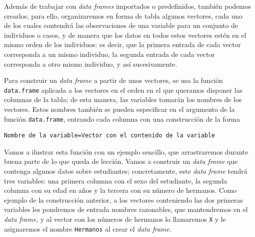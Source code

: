 \documentclass[
]{book}
\theoremstyle{definition}
\theoremstyle{definition}
\theoremstyle{definition}
\theoremstyle{remark}
\begin{document}
Además de trabajar con \emph{data frames} importados o predefinidos, también podemos crearlos; para ello, organizaremos en forma de tabla algunos vectores, cada uno de los cuales contendrá las observaciones de una variable para un conjunto de individuos o casos, y de manera que los datos en todos estos vectores estén en el mismo orden de los individuos: es decir, que la primera entrada de cada vector corresponda a un mismo individuo, la segunda entrada de cada vector corresponda a otro mismo individuo, y así sucesivamente.

Para construir un \emph{data frame} a partir de unos vectores, se usa la función \texttt{data.frame} aplicada a los vectores en el orden en el que queramos disponer las columnas de la tabla;
de esta manera, las variables tomarán los nombres de los vectores. Estos nombres también se pueden especificar en el argumento de la función \texttt{data.frame}, entrando cada columna con una construcción de la forma

\begin{verbatim}
Nombre de la variable=Vector con el contenido de la variable
\end{verbatim}

Vamos a ilustrar esta función con un ejemplo sencillo, que arrastraremos durante buena parte de lo que queda de lección. Vamos a construir un \emph{data frame} que contenga algunos datos sobre estudiantes; concretamente, este \emph{data frame} tendrá tres variables: una primera columna con el sexo del estudiante, la segunda columna con su edad en años y la tercera con su número de hermanos. Como ejemplo de la construcción anterior, a los vectores conteniendo las dos primeras variables les pondremos de entrada nombres razonables, que mantendremos en el \emph{data frame}, y al vector con los números de hermanos lo llamaremos \texttt{X} y le asignaremos el nombre \texttt{Hermanos} al crear el \emph{data frame}.
\end{document}
